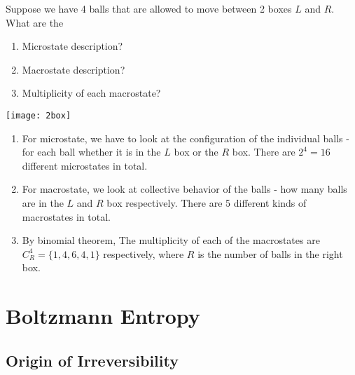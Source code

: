 \documentclass[class=article, crop=false, 12pt]{standalone}
\begin{document}
\begin{example}
    Suppose we have 4 balls that are allowed to move between 2 boxes $L$ and $R$. What are the 
    \begin{enumerate}
        \item Microstate description?
        \item Macrostate description?
        \item Multiplicity of each macrostate?
    \end{enumerate}

    \begin{center}
        \begin{minipage}{0.95\linewidth}
            \centering
            \texttt{[image: 2box]}
        \end{minipage}
    \end{center}

    \begin{enumerate}
        \item For microstate, 
        we have to look at the configuration of the individual balls - 
        for each ball whether it is in the $L$ box or the $R$ box. 
        There are $2^4=16$ different microstates in total.

        \item For macrostate, we look at collective behavior of the balls - 
        how many balls are in the $L$ and $R$ box respectively. 
        There are 5 different kinds of macrostates in total.

        \item By binomial theorem, 
        The multiplicity of each of the macrostates are $C^4_R = \{1,4,6,4,1\}$ respectively,
        where $R$ is the number of balls in the right box. 

    \end{enumerate}
\end{example}



\linesep
\section{Boltzmann Entropy}

\subsection{Origin of Irreversibility}
\end{document}
